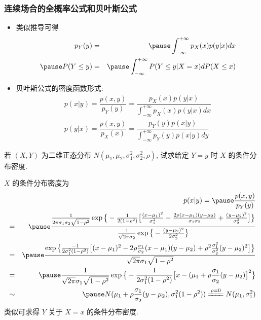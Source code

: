\documentclass[Prob-All.tex]{subfiles}
\begin{document}
\begin{frame}
	\frametitle{连续场合的全概率公式和贝叶斯公式}
	\begin{itemize}[<+-|alert@+>]
		\item 类似推导可得
		\begin{eqnarray*}
			p_Y(y)&=&\pause \int_{-\infty}^{+\infty}p_X(x)p(y|x)dx \\
			\pause P(Y\le y)&=& \pause \int_{-\infty}^{+\infty}P(Y\le y|X=x)dP(X\le x)
		\end{eqnarray*}
		\item 贝叶斯公式的密度函数形式:
		\begin{eqnarray*}
			p(x|y)=\dfrac{p(x,y)}{p_Y(y)}=\dfrac{p_X(x)p(y|x)}{\int_{-\infty}^{+\infty}p_X(x)p(y|x)dx}\\
			p(y|x)=\dfrac{p(x,y)}{p_X(x)}=\dfrac{p_Y(y)p(x|y)}{\int_{-\infty}^{+\infty}p_Y(y)p(x|y)dy}
		\end{eqnarray*}

	\end{itemize}
\end{frame}


\begin{frame}
	\begin{exam}
		若 $(X,Y)$ 为二维正态分布 $N (\mu_1,\mu_2,\sigma_1^2,\sigma_2^2,\rho)$, 试求给定 $Y=y$ 时 $X$ 的条件分布密度.\\
	\end{exam}


	\pause\jieda $X$ 的条件分布密度为
	\begin{eqnarray*}
		&&\hspace{-0.8cm}p(x|y)=\pause \dfrac{p(x,y)}{p_Y(y)}\\
		&=&\pause  \dfrac{\frac{1}{2\pi \sigma_1\sigma_2\sqrt{1-\rho^2}}\exp\big\{-\frac{1}{2(1-\rho^2)}\big[\frac{(x-\mu_1)^2}{\sigma_1^2}-\frac{2\rho(x-\mu_1)(y-\mu_2)}{\sigma_1\sigma_2}+\frac{(y-\mu_2)^2}{\sigma_2^2}\big]\big\}}{\frac{1}{\sqrt{2\pi}\sigma_2}\exp\big\{-\frac{(y-\mu_2)^2}{2\sigma_2^2}\big\}}\\
		&=&\pause \frac{\exp\big\{\frac{-1}{2\sigma_1^2(1-\rho^2)}\big[(x-\mu_1)^2-2\rho\frac{\sigma_1}{\sigma_2}(x-\mu_1)(y-\mu_2)+\rho^2\frac{\sigma_1^2}{\sigma_2^2}(y-\mu_2)^2\big]\big\}}{\sqrt{2\pi} \sigma_1\sqrt{1-\rho^2}}\\
		&=&\pause \frac{1}{\sqrt{2\pi} \sigma_1\sqrt{1-\rho^2}}\exp\big\{-\frac{1}{2\sigma_1^2(1-\rho^2)}\big[x-(\mu_1+\rho\frac{\sigma_1}{\sigma_2}(y-\mu_2)\big]^2\big\}\\
		&\sim&\pause  N(\mu_1+\rho\frac{\sigma_1}{\sigma_2}(y-\mu_2),\sigma_1^2(1-\rho^2)) \xlongequal{\rho=0} N(\mu_1,\sigma_1^2)
	\end{eqnarray*}
	\pause 类似可求得 $Y$ 关于 $X=x$ 的条件分布密度.
\end{frame}
\end{document}
